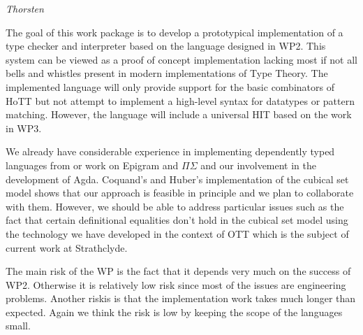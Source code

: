 \documentclass[twocolumn,a4paper,11pt]{article}
\begin{document}
\emph{Thorsten}

The goal of this work package is to develop a prototypical
implementation of a type checker and interpreter based on the language
designed in WP2. This system can be viewed as a proof of concept
implementation lacking most if not all bells and whistles present in
modern implementations of Type Theory. The implemented language will
only provide support for the basic combinators of HoTT but not attempt
to implement a high-level syntax for datatypes or pattern
matching. However, the language will include a universal HIT based on
the work in WP3. 

We already have considerable experience in implementing dependently
typed languages from or work on Epigram and $\Pi\Sigma$ and our
involvement in the development of Agda. Coquand's and Huber's
implementation of the cubical set model shows that our approach is
feasible in principle and we plan to collaborate with them. However,
we should be able to address particular issues such as the fact that
certain definitional equalities don't hold in the cubical set model
using the technology we have developed in the context of OTT
\cite{alti:ott-conf} which is the subject of current work at
Strathclyde. 

The main risk of the WP is the fact that it depends very much on the
success of WP2. Otherwise it is relatively low risk since most of the
issues are engineering problems. Another riskis is that the
implementation work takes much longer than expected. Again we think the
risk is low by keeping the scope of the languages small.


\end{document}
